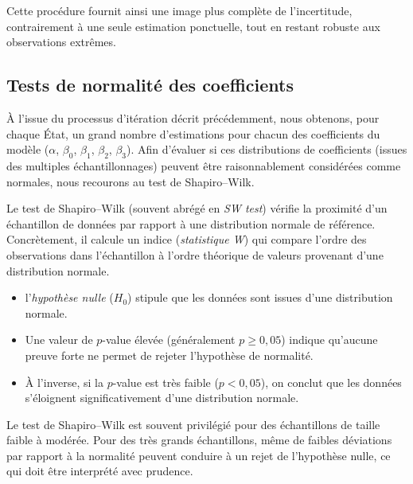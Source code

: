 Cette procédure fournit ainsi une image plus complète de l'incertitude, contrairement à une seule estimation ponctuelle, tout en restant robuste aux observations extrêmes.


\subsection{Tests de normalité des coefficients}
À l'issue du processus d'itération décrit précédemment, nous obtenons, pour chaque État, un grand nombre d'estimations pour chacun des coefficients du modèle (\(\alpha\), \(\beta_0\), \(\beta_1\), \(\beta_2\), \(\beta_3\)). Afin d'évaluer si ces distributions de coefficients (issues des multiples échantillonnages) peuvent être raisonnablement considérées comme normales, nous recourons au test de Shapiro–Wilk.

Le test de Shapiro–Wilk (souvent abrégé en \emph{SW test}) vérifie la proximité d'un échantillon de données par rapport à une distribution normale de référence. Concrètement, il calcule un indice (\emph{statistique W}) qui compare l'ordre des observations dans l'échantillon à l'ordre théorique de valeurs provenant d'une distribution normale. 
\begin{itemize}
	\item l'\emph{hypothèse nulle} (\(H_0\)) stipule que les données sont issues d'une distribution normale.
	\item Une valeur de \(p\)-value élevée (généralement \(p \geq 0{,}05\)) indique qu’aucune preuve forte ne permet de rejeter l'hypothèse de normalité.
	\item À l'inverse, si la \(p\)-value est très faible (\(p<0{,}05\)), on conclut que les données s'éloignent significativement d'une distribution normale.
\end{itemize}

Le test de Shapiro–Wilk est souvent privilégié pour des échantillons de taille faible à modérée. Pour des très grands échantillons, même de faibles déviations par rapport à la normalité peuvent conduire à un rejet de l'hypothèse nulle, ce qui doit être interprété avec prudence.

